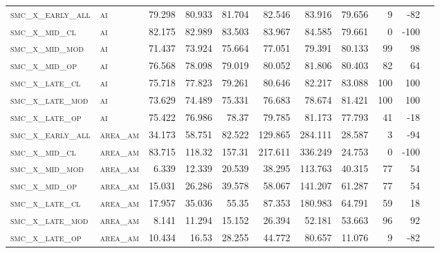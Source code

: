 \begin{landscape}
\begin{center}
\begin{footnotesize}
\begin{longtable}{llrrrrrr|rrr}
\hline \hline
\endlastfoot

\textsc{smc\_x\_early\_all} & \textsc{ai        }   & 79.298     & 80.933     & 81.704     & 82.546     & 83.916     & 79.656     & 9     & -82    \\
\textsc{smc\_x\_mid\_cl   } & \textsc{ai        }   & 82.175     & 82.989     & 83.503     & 83.967     & 84.585     & 79.661     & 0     & -100   \\
\textsc{smc\_x\_mid\_mod  } & \textsc{ai        }   & 71.437     & 73.924     & 75.664     & 77.051     & 79.391     & 80.133     & 99    & 98     \\
\textsc{smc\_x\_mid\_op   } & \textsc{ai        }   & 76.568     & 78.098     & 79.019     & 80.052     & 81.806     & 80.403     & 82    & 64     \\
\textsc{smc\_x\_late\_cl  } & \textsc{ai        }   & 75.718     & 77.823     & 79.261     & 80.646     & 82.217     & 83.088     & 100   & 100    \\
\textsc{smc\_x\_late\_mod } & \textsc{ai        }   & 73.629     & 74.489     & 75.331     & 76.683     & 78.674     & 81.421     & 100   & 100    \\
\textsc{smc\_x\_late\_op  } & \textsc{ai        }   & 75.422     & 76.986     & 78.37      & 79.785     & 81.173     & 77.793     & 41    & -18    \\
\textsc{smc\_x\_early\_all} & \textsc{area\_am  }   & 34.173     & 58.751     & 82.522     & 129.865    & 284.111    & 28.587     & 3     & -94    \\
\textsc{smc\_x\_mid\_cl   } & \textsc{area\_am  }   & 83.715     & 118.32     & 157.31     & 217.611    & 336.249    & 24.753     & 0     & -100   \\
\textsc{smc\_x\_mid\_mod  } & \textsc{area\_am  }   & 6.339      & 12.339     & 20.539     & 38.295     & 113.763    & 40.315     & 77    & 54     \\
\textsc{smc\_x\_mid\_op   } & \textsc{area\_am  }   & 15.031     & 26.286     & 39.578     & 58.067     & 141.207    & 61.287     & 77    & 54     \\
\textsc{smc\_x\_late\_cl  } & \textsc{area\_am  }   & 17.957     & 35.036     & 55.35      & 87.353     & 180.983    & 64.791     & 59    & 18     \\
\textsc{smc\_x\_late\_mod } & \textsc{area\_am  }   & 8.141      & 11.294     & 15.152     & 26.394     & 52.181     & 53.663     & 96    & 92     \\
\textsc{smc\_x\_late\_op  } & \textsc{area\_am  }   & 10.434     & 16.53      & 28.255     & 44.772     & 80.657     & 11.076     & 9     & -82    \\

\end{longtable}
\end{footnotesize}
\end{center}
\end{landscape}
